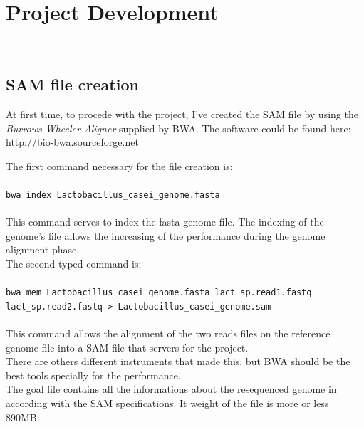 
\chapter{Project Development}
\label{cap:project-development}

\\

\section{SAM file creation}
At first time, to procede with the project, I've created the SAM file by using the \emph{Burrows-Wheeler Aligner} supplied by BWA.
The software could be found here: \href{http://bio-bwa.sourceforge.net}{http://bio-bwa.sourceforge.net}

The first command necessary for the file creation is:
\\
\\
\verb|bwa index Lactobacillus_casei_genome.fasta|
\\
\\
This command serves to index the fasta genome file. The indexing of the genome's file allows the increasing of the performance during the genome alignment phase.\\

The second typed command is:
\\
\\
\verb|bwa mem Lactobacillus_casei_genome.fasta lact_sp.read1.fastq lact_sp.read2.fastq > Lactobacillus_casei_genome.sam|
\\
\\
This command allows the alignment of the two reads files on the reference genome file into a SAM file that servers for the project.\\

There are others different instruments that made this, but BWA should be the best tools specially for the performance.\\

The goal file contains all the informations about the resequenced genome in according with the SAM specifications.
It weight of the file is more or less 890MB.
\newpage

